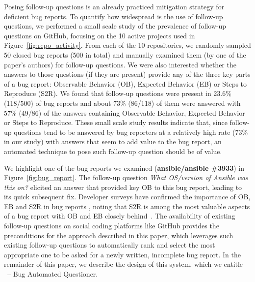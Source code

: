 Posing follow-up questions is an already practiced mitigation strategy for deficient bug
reports. To quantify how widespread is the use of
follow-up questions, we performed a small scale study of the prevalence
of follow-up questions on GitHub, focusing on the 10 active projects used in Figure~\ref{fig:repo_activity}.
From each of the 10 repositories, we randomly sampled 50 closed bug reports (500 in total) and manually examined them (by one of the paper's authors) for follow-up questions. We were also interested whether the answers to those questions (if they are present) provide any
of the three key parts of a bug report: Observable Behavior (OB), Expected Behavior (EB) or Steps to Reproduce (S2R).
We found that follow-up questions were present in 23.6\% (118/500) of bug reports and about 73\% (86/118) of them were
answered with 57\% (49/86) of the answers containing Observable Behavior, Expected Behavior or Steps to Reproduce.
These small scale study results indicate that, since follow-up questions tend to be answered by bug reporters at a relatively high rate (73\% in our study) with answers that seem to add value to the bug report, an automated technique to pose such follow-up question should be of value.

We highlight one of the bug reports we examined ({\bf ansible/ansible \#3933}) in Figure~\ref{fig:bug_report}. The follow-up question {\em What OS/version of
Ansible was this on?} elicited an answer that provided key OB to this bug report, leading to its quick subsequent fix.
Developer surveys have confirmed the importance of OB, EB and S2R in bug reports , noting that S2R is among the most valuable aspects of a bug report
with OB and EB closely behind~\cite{zimmermann10whatmakes,laukkanen2011survey}. The availability of existing follow-up questions on social coding platforms like GitHub provides the preconditions for the approach described in this paper, which leverages such existing follow-up questions to automatically rank and select the most appropriate one to be asked for a newly written, incomplete bug report. In the remainder of this paper, we describe the design of this system, which we entitle \evpi\ -- Bug Automated Questioner\footnotemark{}.
